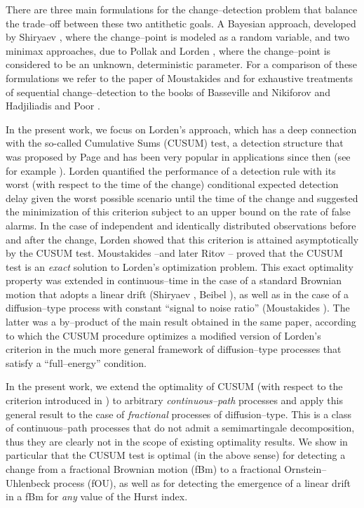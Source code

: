\documentclass[11pt,reqno]{amsart}
\theoremstyle{remark}
\begin{document}
There are three main formulations for the change--detection problem that  balance the trade--off 
between these two antithetic goals. A Bayesian approach, developed by Shiryaev \cite{shiry}, where the change--point is modeled as a random variable, and two minimax approaches, due to Pollak \cite{pol} and Lorden \cite{lord}, where the change--point is considered to be an unknown, deterministic parameter. For a comparison of these formulations we refer to the paper of Moustakides \cite{moustann} and for exhaustive treatments of sequential change--detection 
to the books of Basseville and Nikiforov \cite{niki} and Hadjiliadis and Poor \cite{oly}.  

In the present work, we focus on  Lorden's approach, which has a deep connection with the so-called Cumulative Sums (CUSUM) test, a detection structure that was proposed by Page \cite{page} and has been very popular in applications since then (see for example \cite{olw}). Lorden \cite{lord} quantified the performance of a detection rule with its worst (with respect to the time of the change) conditional expected detection delay given the worst possible scenario until the time of the change and suggested the minimization of  this criterion subject to an upper bound on the rate of 
false alarms.  In the case of independent and identically distributed observations before and after the change, Lorden showed that this criterion is attained asymptotically by the CUSUM test. Moustakides \cite{moust} --and later Ritov \cite{rito}-- proved that the CUSUM test is an \textit{exact} solution to Lorden's optimization problem. This exact optimality property was extended in continuous--time in the case of a standard Brownian motion that adopts a linear drift
(Shiryaev \cite{shircus}, Beibel \cite{beib}), as well as in the case of a diffusion--type process  with constant ``signal to  noise ratio'' (Moustakides \cite{moustito}). The latter was a by--product of the main result obtained in the same paper, according to which  the CUSUM procedure optimizes a modified version of Lorden's criterion in the much more general framework of diffusion--type processes that satisfy a ``full--energy'' condition.

In the present work, we extend the optimality of CUSUM (with respect to the criterion introduced in \cite{moustito}) to arbitrary \textit{continuous--path} processes and apply this general result to the case of \textit{fractional} processes of diffusion--type.
This is a class of continuous--path processes that do not admit a semimartingale decomposition, thus they are clearly not in the scope of existing optimality results. We show in particular that the CUSUM test is optimal (in the above sense) for detecting a change from a fractional Brownian motion (fBm) to a fractional Ornstein--Uhlenbeck process (fOU), as well as for detecting the emergence of a  linear drift in a fBm for \textit{any} value of the Hurst index. 
\end{document}
